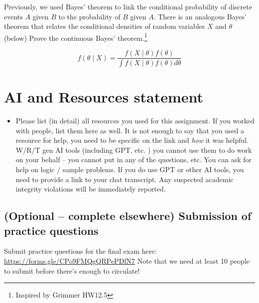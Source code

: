 \documentclass[
]{article}
\providecommand{\tightlist}{%
  \setlength{\itemsep}{0pt}\setlength{\parskip}{0pt}}
\begin{document}
Previously, we used Bayes' theorem to link the conditional probability
of discrete events \(A\) given \(B\) to the probability of \(B\) given
\(A\). There is an analogous Bayes' theorem that relates the conditional
densities of random variables \(X\) and \(\theta\) (below) Prove the
continuous Bayes' theorem.\footnote{Inspired by Grimmer HW12.5}

\[f(\theta \mid X) = \frac{f(X \mid \theta) f(\theta)}{\int f(X \mid \theta) f(\theta)d\theta}\]

\hfill\break
\hfill\break
\hfill\break
\hfill\break
\hfill\break
\hfill\break
\hfill\break
\hfill\break

\section{AI and Resources statement}\label{ai-and-resources-statement}

\begin{itemize}
\tightlist
\item
  Please list (in detail) all resources you used for this assignment. If
  you worked with people, list them here as well. It is not enough to
  say that you used a resource for help, you need to be specific on the
  link and \emph{how} it was helpful. W/R/T gen AI tools (including GPT,
  etc. ) you cannot use them to do work on your behalf -- you cannot put
  in any of the questions, etc. You can ask for help on logic / sample
  problems. If you do use GPT or other AI tools, you need to provide a
  link to your chat transcript. Any suspected academic integrity
  violations will be immediately reported.
\end{itemize}

\subsection{(Optional -- complete elsewhere) Submission of practice
questions}\label{optional-complete-elsewhere-submission-of-practice-questions}

Submit practice questions for the final exam here:
\url{https://forms.gle/CPo9FMQgQRPePDfN7} Note that we need at least 10
people to submit before there's enough to circulate!
\end{document}
